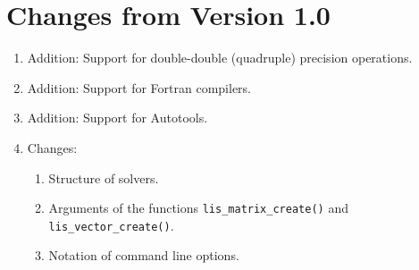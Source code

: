\documentclass[a4paper]{article}
\begin{document}
\newpage
\section*{Changes from Version 1.0}
\begin{enumerate}
\item Addition: Support for double-double (quadruple) precision operations.
\item Addition: Support for Fortran compilers.
\item Addition: Support for Autotools.
\item Changes: 
\begin{enumerate}
\item Structure of solvers.
\item Arguments of the functions {\tt lis\_matrix\_create()} and {\tt lis\_vector\_create()}.
\item Notation of command line options.
\end{enumerate}
\end{enumerate}
\end{document}
